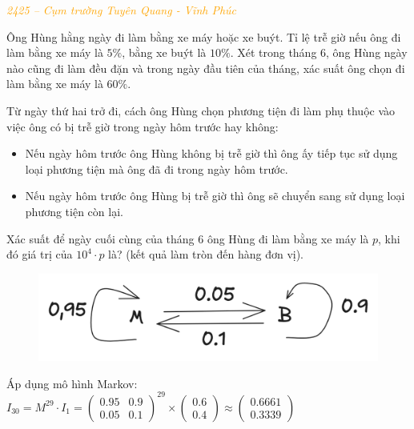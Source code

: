\documentclass[twoside,final]{hcmut-report}
\newcommand{\exercise}[1]{\begin{exercisebox}#1\end{exercisebox}}
\begin{document}
\exercise{
    \textcolor{orange}{\textit{2425 -- Cụm trường Tuyên Quang - Vĩnh Phúc}}

    Ông Hùng hằng ngày đi làm bằng xe máy hoặc xe buýt. Tỉ lệ trễ giờ nếu ông đi làm bằng xe máy là $5\%$, bằng xe buýt là $10\%$. Xét trong tháng 6, ông Hùng ngày nào cũng đi làm đều đặn và trong ngày đầu tiên của tháng, xác suất ông chọn đi làm bằng xe máy là $60\%$.

    Từ ngày thứ hai trở đi, cách ông Hùng chọn phương tiện đi làm phụ thuộc vào việc ông có bị trễ giờ trong ngày hôm trước hay không:
    \begin{itemize}[itemsep=0pt, topsep=0pt, parsep=0pt,label=-]
        \item Nếu ngày hôm trước ông Hùng không bị trễ giờ thì ông ấy tiếp tục sử dụng loại phương tiện mà ông đã đi trong ngày hôm trước.
        \item Nếu ngày hôm trước ông Hùng bị trễ giờ thì ông sẽ chuyển sang sử dụng loại phương tiện còn lại.
    \end{itemize}

    Xác suất để ngày cuối cùng của tháng 6 ông Hùng đi làm bằng xe máy là $p$, khi đó giá trị của $10^4\cdot p$ là? (kết quả làm tròn đến hàng đơn vị).
}
\begin{figure}
    \centering
    \includegraphics*[width=1.03\linewidth]{images/XSTK/TQ-VP.png}
\end{figure}
Áp dụng mô hình Markov: $I_{30} = M^{29}\cdot I_1 = \begin{pmatrix}
        0.95 & 0.9 \\
        0.05 & 0.1
    \end{pmatrix}^{29}\times \begin{pmatrix}
        0.6 \\ 0.4
    \end{pmatrix} \approx \begin{pmatrix}
        0.6661 \\0.3339
    \end{pmatrix}$
\end{document}
